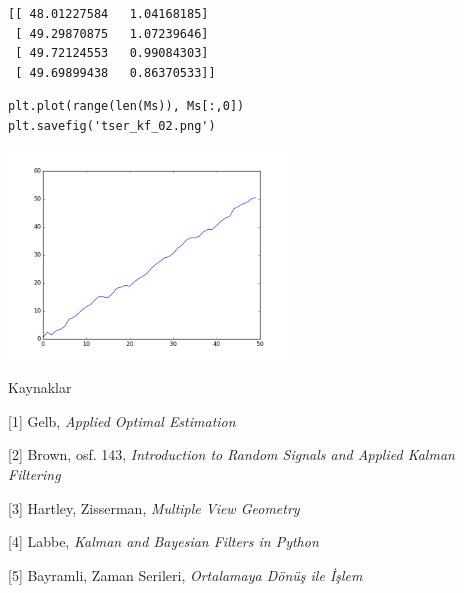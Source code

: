 \documentclass[12pt,fleqn]{article}\usepackage{../../common}
\begin{document}
\begin{verbatim}
[[ 48.01227584   1.04168185]
 [ 49.29870875   1.07239646]
 [ 49.72124553   0.99084303]
 [ 49.69899438   0.86370533]]
\end{verbatim}

\begin{verbatim}
plt.plot(range(len(Ms)), Ms[:,0])
plt.savefig('tser_kf_02.png')
\end{verbatim}

\includegraphics[width=20em]{tser_kf_02.png}

Kaynaklar

[1] Gelb, {\em Applied Optimal Estimation}

[2] Brown, osf. 143, {\em Introduction to Random Signals and Applied Kalman Filtering}

[3] Hartley, Zisserman, {\em Multiple View Geometry} 

[4] Labbe, {\em Kalman and Bayesian Filters in Python}

[5] Bayramli, Zaman Serileri, {\em Ortalamaya Dönüş ile İşlem}
\end{document}
